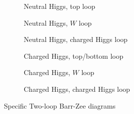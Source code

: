 \begin{figure}[p]
	\centering
	\begin{adjustbox}{center}
	\begin{subfigure}[t]{0.6\textwidth}
		\centering
		\caption{Neutral Higgs, top loop}
		\label{fig:BarrZee-phiG-toploop}
	\end{subfigure}\hfill
	\begin{subfigure}[t]{0.6\textwidth}
		\centering
		\caption{Neutral Higgs, \(W \) loop}
		\label{fig:BarrZee-phiG-Wloop}
	\end{subfigure}
	\end{adjustbox}
	\begin{adjustbox}{center}
	\begin{subfigure}[t]{0.6\textwidth}
		\centering
		\caption{Neutral Higgs, charged Higgs loop}
		\label{fig:BarrZee-phiG-cHloop}
	\end{subfigure}\hfill
	\begin{subfigure}[t]{0.6\textwidth}
		\centering
		\caption{Charged Higgs, top/bottom loop}
		\label{fig:BarrZee-cHW-tbloop}
	\end{subfigure}
	\end{adjustbox}
	\begin{adjustbox}{center}
	\begin{subfigure}[t]{0.6\textwidth}
		\centering
		\caption{Charged Higgs, \(W \) loop}
		\label{fig:BarrZee_cHW_Wloop}
	\end{subfigure}\hfill
	\begin{subfigure}[t]{0.6\textwidth}
		\centering
		\caption{Charged Higgs, charged Higgs loop}
		\label{fig:BarrZee-cHW-cHloop}
	\end{subfigure}
	\end{adjustbox}
	\caption{Specific Two-loop Barr-Zee diagrams}
	\label{fig:BarrZee-specific}
\end{figure}

